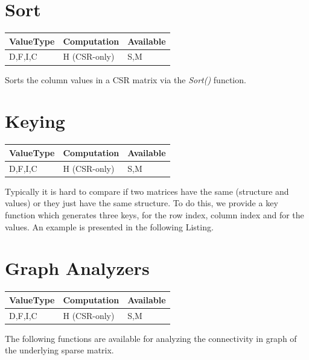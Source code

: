 \section{Sort}

\begin{table}[H]
\begin{tabular}{l|l|l}
\multicolumn{1}{c|}{ValueType} & Computation & Available \\ \hline
D,F,I,C                        & H (CSR-only)& S,M    
\end{tabular}
\end{table}

Sorts the column values in a CSR matrix via the \emph{Sort()} function.


\section{Keying}

\begin{table}[H]
\begin{tabular}{l|l|l}
\multicolumn{1}{c|}{ValueType} & Computation & Available \\ \hline
D,F,I,C                        & H (CSR-only)& S,M
\end{tabular}
\end{table}

Typically it is hard to compare if two matrices have the same (structure and values) or they just have the same structure. To do this, we provide a key function which generates three keys, for the row index, column index and for the values. An example is presented in the following Listing.





\section{Graph Analyzers}

\begin{table}[H]
\begin{tabular}{l|l|l}
\multicolumn{1}{c|}{ValueType} & Computation & Available \\ \hline
D,F,I,C                        & H (CSR-only)& S,M    
\end{tabular}
\end{table}


The following functions are available for analyzing the connectivity in graph of the underlying sparse matrix.

